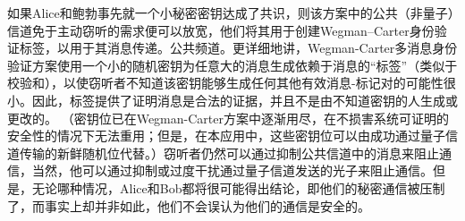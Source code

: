 如果Alice和鲍勃事先就一个小秘密密钥达成了共识，则该方案中的公共（非量子）信道免于主动窃听的需求便可以放宽，他们将其用于创建Wegman–Carter身份验证标签\cite{Goldreich1991}，以用于其消息传递。公共频道。更详细地讲，Wegman-Carter多消息身份验证方案使用一个小的随机密钥为任意大的消息生成依赖于消息的“标签”（类似于校验和），以使窃听者不知道该密钥能够生成任何其他有效消息-标记对的可能性很小。因此，标签提供了证明消息是合法的证据，并且不是由不知道密钥的人生成或更改的。 （密钥位已在Wegman-Carter方案中逐渐用尽，在不损害系统可证明的安全性的情况下无法重用；但是，在本应用中，这些密钥位可以由成功通过量子信道传输的新鲜随机位代替。）窃听者仍然可以通过抑制公共信道中的消息来阻止通信，当然，他可以通过抑制或过度干扰通过量子信道发送的光子来阻止通信。但是，无论哪种情况，Alice和Bob都将很可能得出结论，即他们的秘密通信被压制了，而事实上却并非如此，他们不会误认为他们的通信是安全的。



